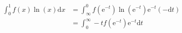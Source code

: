 \documentclass[a4paper,10pt,twocolumn]{article}
\newcommand{\td}{\mathrm{d}}
\newcommand{\te}{\mathrm{e}}
\begin{document}
\begin{align}
\int_0^1 f(x) \ln(x) \td x
& = \int_{\infty}^0 f(\te^{-t}) \ln(\te^{-t}) \te^{-t} (-\td t) \nonumber \\
& = \int_{0}^{\infty} -t f(\te^{-t}) \te^{-t} \td t
\end{align}
\end{document}
